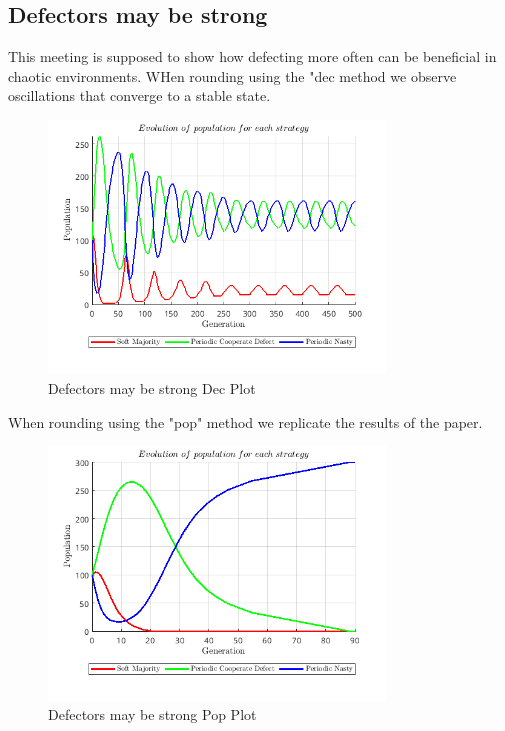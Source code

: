 \subsection{Defectors may be strong}
This meeting is supposed to show how defecting more often can be beneficial in chaotic environments. WHen rounding using the "dec method we observe oscillations that converge to a stable state. 
\begin{figure}[H]
    \centering
    \includegraphics[width=0.8\textwidth]{media/meetings/defectors_may_be_strong_dec.png}
    \caption{Defectors may be strong Dec Plot}
\end{figure}
When rounding using the "pop" method we replicate the results of the paper.
\begin{figure}[H]
    \centering
    \includegraphics[width=0.8\textwidth]{media/meetings/defectors_may_be_strong_pop.png}
    \caption{Defectors may be strong Pop Plot}
\end{figure}

